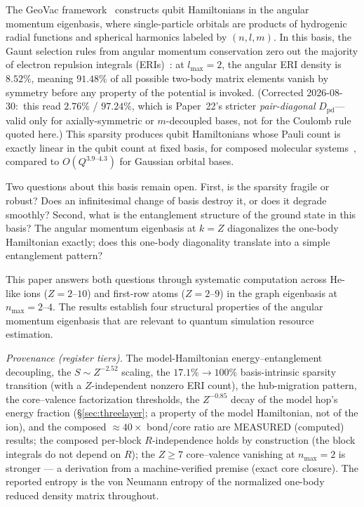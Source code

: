 \documentclass[twocolumn,pra,amsmath,amssymb,superscriptaddress]{revtex4-2}
\begin{document}
The GeoVac framework~\cite{GeoVac_Paper0, GeoVac_Paper7,
GeoVac_Paper14} constructs qubit Hamiltonians in the angular
momentum eigenbasis, where single-particle orbitals are products
of hydrogenic radial functions and spherical harmonics labeled by
$(n, l, m)$.  In this basis, the Gaunt selection rules from angular
momentum conservation zero out the majority of electron repulsion
integrals (ERIs)~\cite{GeoVac_Paper22}: at $l_{\max} = 2$, the
angular ERI density is $8.52\%$, meaning $91.48\%$ of all possible
two-body matrix elements vanish by symmetry before any property of
the potential is invoked.  (Corrected 2026-08-30:\ this read $2.76\%$
/ $97.24\%$, which is Paper~22's stricter \emph{pair-diagonal}
$D_{\mathrm{pd}}$---valid only for axially-symmetric or $m$-decoupled
bases, not for the Coulomb rule quoted here.)  This sparsity produces qubit
Hamiltonians whose Pauli count is exactly linear in the qubit count at
fixed basis, for composed molecular
systems~\cite{GeoVac_Paper14}, compared to $O(Q^{3.9\text{--}4.3})$
for Gaussian orbital bases.

Two questions about this basis remain open.  First, is the sparsity
fragile or robust?  Does an infinitesimal change of basis destroy
it, or does it degrade smoothly?  Second, what is the entanglement
structure of the ground state in this basis?  The angular momentum
eigenbasis at $k = Z$ diagonalizes the one-body Hamiltonian
exactly; does this one-body diagonality translate into a simple
entanglement pattern?

This paper answers both questions through systematic computation
across He-like ions ($Z = 2$--$10$) and first-row atoms
($Z = 2$--$9$) in the graph eigenbasis at $n_{\max} = 2$--$4$.
The results establish four structural properties of the angular
momentum eigenbasis that are relevant to quantum simulation
resource estimation.

\emph{Provenance (register tiers).}  The model-Hamiltonian
energy--entanglement decoupling, the $S\sim Z^{-2.52}$ scaling, the
$17.1\%\!\to\!100\%$ basis-intrinsic sparsity transition (with a
$Z$-independent nonzero ERI count), the hub-migration pattern, the
core--valence factorization thresholds, the $Z^{-0.85}$ decay of the
model hop's energy fraction (\S\ref{sec:threelayer}; a property of the
model Hamiltonian, not of the ion), and the
composed $\approx 40\times$ bond/core ratio are MEASURED (computed)
results; the composed per-block $R$-independence holds by construction
(the block integrals do not depend on $R$); the $Z \geq 7$
core--valence vanishing at $n_{\max} = 2$ is stronger --- a derivation
from a machine-verified premise (exact core closure).  The reported
entropy is the von Neumann entropy of the normalized one-body reduced
density matrix throughout.
\end{document}
